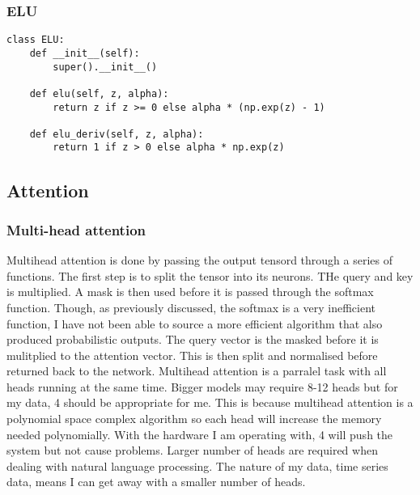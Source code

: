 \documentclass{article}
\begin{document}
\subsubsection{ELU}
\begin{lstlisting}
class ELU:
    def __init__(self):
        super().__init__()

    def elu(self, z, alpha):
        return z if z >= 0 else alpha * (np.exp(z) - 1)

    def elu_deriv(self, z, alpha):
        return 1 if z > 0 else alpha * np.exp(z)
\end{lstlisting}


\subsection{Attention}
\subsubsection{Multi-head attention}
Multihead attention is done by passing the output tensord through a series of functions.
The first step is to split the tensor into its neurons. THe query and key is multiplied.
A mask is then used before it is passed through the softmax function. Though, as
previously discussed, the softmax is a very inefficient function, I have not been
able to source a more efficient algorithm that also produced probabilistic outputs.
The query vector is the masked before it is mulitplied to the attention vector.
This is then split and normalised before returned back to the network.
Multihead attention is a parralel task with all heads running at the same time. Bigger
models may require 8-12 heads but for my data, 4 should be appropriate for me. This
is because multihead attention is a polynomial space complex algorithm so each head
will increase the memory needed polynomially. With the hardware I am operating with,
4 will push the system but not cause problems. Larger number of heads are required when
dealing with natural language processing. The nature of my data, time series data, means I can get away with a smaller number of heads.
\end{document}
